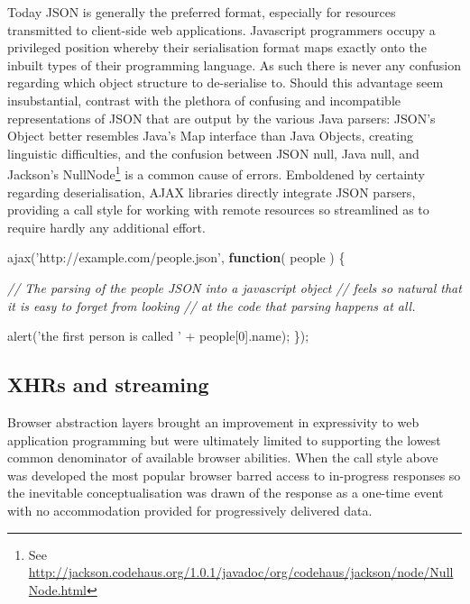 \documentclass[12pt, ]{article}
\newenvironment{Shaded}{}{}
\newcommand{\KeywordTok}[1]{\textcolor[rgb]{0.00,0.44,0.13}{\textbf{{#1}}}}
\newcommand{\DecValTok}[1]{\textcolor[rgb]{0.25,0.63,0.44}{{#1}}}
\newcommand{\StringTok}[1]{\textcolor[rgb]{0.25,0.44,0.63}{{#1}}}
\newcommand{\CommentTok}[1]{\textcolor[rgb]{0.38,0.63,0.69}{\textit{{#1}}}}
\newcommand{\FunctionTok}[1]{\textcolor[rgb]{0.02,0.16,0.49}{{#1}}}
\newcommand{\NormalTok}[1]{{#1}}
\begin{document}
Today JSON is generally the preferred format, especially for resources
transmitted to client-side web applications. Javascript programmers
occupy a privileged position whereby their serialisation format maps
exactly onto the inbuilt types of their programming language. As such
there is never any confusion regarding which object structure to
de-serialise to. Should this advantage seem insubstantial, contrast with
the plethora of confusing and incompatible representations of JSON that
are output by the various Java parsers: JSON's Object better resembles
Java's Map interface than Java Objects, creating linguistic
difficulties, and the confusion between JSON null, Java null, and
Jackson's NullNode\footnote{See
  \url{http://jackson.codehaus.org/1.0.1/javadoc/org/codehaus/jackson/node/NullNode.html}}
is a common cause of errors. Emboldened by certainty regarding
deserialisation, AJAX libraries directly integrate JSON parsers,
providing a call style for working with remote resources so streamlined
as to require hardly any additional effort.

\begin{Shaded}
\begin{Highlighting}[]
\FunctionTok{ajax}\NormalTok{(}\StringTok{'http://example.com/people.json'}\NormalTok{, }\KeywordTok{function}\NormalTok{( people ) \{}

   \CommentTok{// The parsing of the people JSON into a javascript object}
   \CommentTok{// feels so natural that it is easy to forget from looking }
   \CommentTok{// at the code that parsing happens at all. }
   
   \FunctionTok{alert}\NormalTok{(}\StringTok{'the first person is called '} \NormalTok{+ people[}\DecValTok{0}\NormalTok{].}\FunctionTok{name}\NormalTok{);}
\NormalTok{\});}
\end{Highlighting}
\end{Shaded}

\subsection{XHRs and streaming}\label{xhrs-and-streaming}

\label{xhrsandstreaming}

Browser abstraction layers brought an improvement in expressivity to web
application programming but were ultimately limited to supporting the
lowest common denominator of available browser abilities. When the call
style above was developed the most popular browser barred access to
in-progress responses so the inevitable conceptualisation was drawn of
the response as a one-time event with no accommodation provided for
progressively delivered data.
\end{document}
